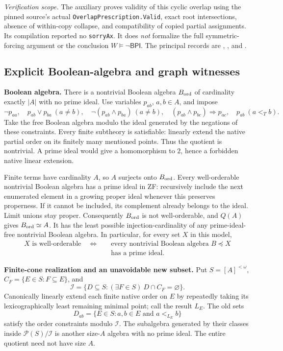\emph{Verification scope.}
The auxiliary  proves validity of this cyclic
overlap using the pinned source's actual
\texttt{OverlapPrescription.Valid}, exact root intersections, absence
of within-copy collapse, and compatibility of copied partial assignments.
Its compilation reported no \texttt{sorryAx}. It does \emph{not}
formalize the full symmetric-forcing argument or the conclusion
$W\models\neg\mathsf{BPI}$.
The principal records are
,
, and
.

\subsection{Explicit Boolean-algebra and graph witnesses}

\textbf{Boolean algebra.}
There is a nontrivial Boolean algebra $B_{\rm ord}$ of cardinality
exactly $|A|$ with no prime ideal. Use variables $p_{ab}$, $a,b\in A$,
and impose
\[
 \neg p_{aa},\quad p_{ab}\vee p_{ba}\ (a\ne b),\quad
 \neg(p_{ab}\wedge p_{ba})\ (a\ne b),\quad
 (p_{ab}\wedge p_{bc})\Rightarrow p_{ac},\quad
 p_{ab}\ (a<_T b).
\]
Take the free Boolean algebra modulo the ideal generated by the
negations of these constraints. Every finite subtheory is satisfiable:
linearly extend the native partial order on its finitely many mentioned
points. Thus the quotient is nontrivial. A prime ideal would give a
homomorphism to $2$, hence a forbidden native linear extension.

Finite terms have cardinality $A$, so $A$ surjects onto $B_{\rm ord}$.
Every well-orderable nontrivial Boolean algebra has a prime ideal in ZF:
recursively include the next enumerated element in a growing proper
ideal whenever this preserves properness. If it cannot be included,
its complement already belongs to the ideal. Limit unions stay proper.
Consequently $B_{\rm ord}$ is not well-orderable, and $Q(A)$ gives
$B_{\rm ord}\simeq A$. It has the least possible injection-cardinality
of any prime-ideal-free nontrivial Boolean algebra. In particular, for
every set $X$ in this model,
\[
 \begin{split}
 X\text{ is well-orderable}\quad\Longleftrightarrow\quad&
 \text{every nontrivial Boolean algebra }B\preccurlyeq X\\[-2pt]
 &\text{has a prime ideal}.
 \end{split}
\]

\textbf{Finite-cone realization and an unavoidable new subset.}
Put $S=[A]^{<\omega}$, $C_F=\{E\in S:F\subseteq E\}$, and
\[
 \mathcal I=\{D\subseteq S:(\exists F\in S)\ D\cap C_F=\varnothing\}.
\]
Canonically linearly extend each finite native order on $E$ by repeatedly
taking its lexicographically least remaining minimal point; call the
result $L_E$. The old sets
\[
 D_{ab}=\{E\in S:a,b\in E\text{ and }a<_{L_E}b\}
\]
satisfy the order constraints modulo $\mathcal I$. The subalgebra
generated by their classes inside $\mathcal P(S)/\mathcal I$ is another
size-$A$ algebra with no prime ideal. The entire quotient need not
have size $A$.

